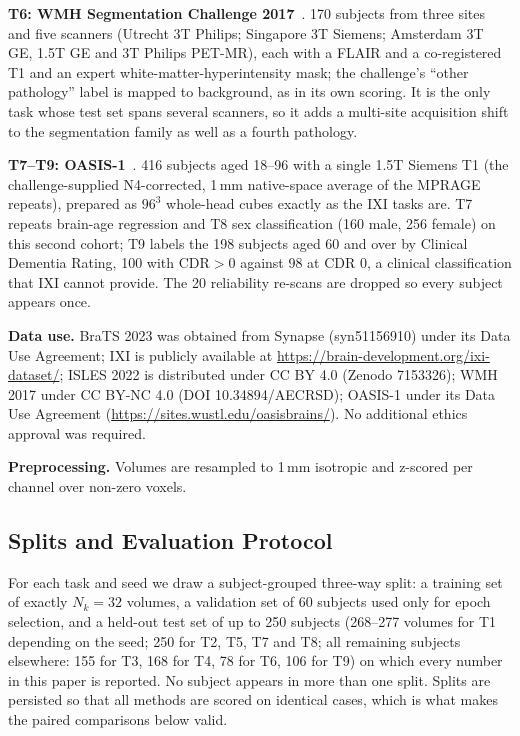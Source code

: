 \iffull\documentclass[journal]{IEEEtran}\else\documentclass[journal,twoside,web]{ieeecolor}\usepackage{generic}\fi
\begin{document}
\textbf{T6: WMH Segmentation Challenge 2017}~\cite{wmh2017}. 170 subjects from three sites and five scanners (Utrecht 3T Philips; Singapore 3T Siemens; Amsterdam 3T GE, 1.5T GE and 3T Philips PET-MR), each with a FLAIR and a co-registered T1 and an expert white-matter-hyperintensity mask; the challenge's ``other pathology'' label is mapped to background, as in its own scoring. It is the only task whose test set spans several scanners, so it adds a multi-site acquisition shift to the segmentation family as well as a fourth pathology.

\textbf{T7--T9: OASIS-1}~\cite{oasis1}. 416 subjects aged 18--96 with a single 1.5T Siemens T1 (the challenge-supplied N4-corrected, 1\,mm native-space average of the MPRAGE repeats), prepared as $96^3$ whole-head cubes exactly as the IXI tasks are. T7 repeats brain-age regression and T8 sex classification (160 male, 256 female) on this second cohort; T9 labels the 198 subjects aged 60 and over by Clinical Dementia Rating, 100 with CDR$>$0 against 98 at CDR 0, a clinical classification that IXI cannot provide. The 20 reliability re-scans are dropped so every subject appears once.

\textbf{Data use.} BraTS 2023 was obtained from Synapse (syn51156910) under its Data Use Agreement; IXI is publicly available at \url{https://brain-development.org/ixi-dataset/}; ISLES 2022 is distributed under CC BY 4.0 (Zenodo 7153326); WMH 2017 under CC BY-NC 4.0 (DOI 10.34894/AECRSD); OASIS-1 under its Data Use Agreement (\url{https://sites.wustl.edu/oasisbrains/}). No additional ethics approval was required.

\textbf{Preprocessing.} Volumes are resampled to 1\,mm isotropic and z-scored per channel over non-zero voxels.

\subsection{Splits and Evaluation Protocol}
\label{sec:protocol}

For each task and seed we draw a subject-grouped three-way split: a training set of exactly $N_k=32$ volumes, a validation set of 60 subjects used only for epoch selection, and a held-out test set of up to 250 subjects (268--277 volumes for T1 depending on the seed; 250 for T2, T5, T7 and T8; all remaining subjects elsewhere: 155 for T3, 168 for T4, 78 for T6, 106 for T9) on which every number in this paper is reported. No subject appears in more than one split. Splits are persisted so that all methods are scored on identical cases, which is what makes the paired comparisons below valid.
\end{document}
